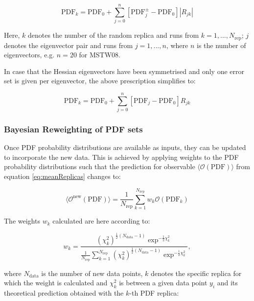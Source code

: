 \begin{equation}
 \mathrm{PDF}_k = \mathrm{PDF}_0  + \sum_{j=0}^{n} \left[ \mathrm{PDF}^{\pm}_j - \mathrm{PDF}_0 \right] |R_{jk}|
\end{equation}
 
Here, $k$ denotes the number of the random replica and runs from $k=1, ... , N_\mathrm{rep}$; $j$ denotes the eigenvector pair and runs from $j=1, ..., n$, where $n$ is the number of eigenvectors, e.g. $n=20$ for MSTW08. 

In case that the Hessian eigenvectors have been symmetrised and only one error set is given per eigenvector, 
the above prescription simplifies to:

\begin{equation}
 \mathrm{PDF}_k = \mathrm{PDF}_0  + \sum_{j=0}^{n} \left[ \mathrm{PDF}_j - \mathrm{PDF}_0 \right] R_{jk}
\end{equation}

\subsubsection{Bayesian Reweighting of PDF sets}

Once PDF probability distributions are available as inputs, they can be updated to incorporate the new data. This is achieved by applying weights to the PDF probability distributions such that the prediction for observable $\langle\mathcal{O}(\mathrm{PDF})\rangle$ from equation \ref{eq:meanReplicas} changes to:

\begin{equation}
 \langle\mathcal{O}^{\mathrm{new}}(\mathrm{PDF})\rangle = \frac{1}{N_{\mathrm{rep}}} \sum_{k=1}^{N_{\mathrm{rep}}} w_k \mathcal{O}(\mathrm{PDF}_k)
\end{equation}

The weights $w_k$ calculated are here according to:

\begin{equation}
 w_k = \frac{(\chi^2_k)^{\frac{1}{2} (N_{\mathrm{data}}-1) } \exp^{-\frac{1}{2}\chi^2_k}}{ \frac{1}{N_{\mathrm{rep}}} \sum^{N_{\mathrm{rep}}}_{k=1}(\chi^2_k)^{\frac{1}{2}(N_{\mathrm{data}}-1)} \exp^{-\frac{1}{2}\chi^2_k}  },
\end{equation}

where $N_{\mathrm{data}}$ is the number of new data points, $k$ denotes the specific replica for which the weight is calculated and $\chi^2_k$ is between a given data point $y_i$ and its theoretical prediction obtained with the $k$-th PDF replica:

